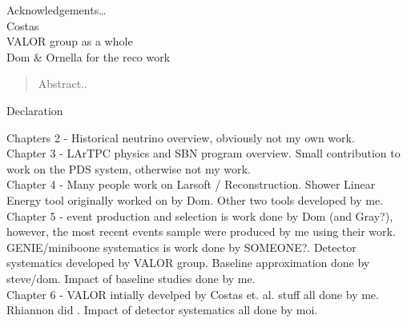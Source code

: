 
\begin{acknowledgements}
  Acknowledgements\dots \\
  Costas \\
  VALOR group as a whole \\
  Dom \& Ornella for the reco work
\end{acknowledgements}

\begin{abstract}%
  Abstract..
\end{abstract}


\begin{declaration}
  Declaration
  \vspace*{1cm}
  
  Chapters 2 - Historical neutrino overview, obviously not my own work. \\
  Chapter 3 - LArTPC physics and SBN program overview. Small contribution to work on the PDS system, otherwise not my work. \\
  Chapter 4 - Many people work on Larsoft / Reconstruction. Shower Linear Energy tool originally worked on by Dom. Other two tools developed by me. \\
  Chapter 5 - \nue event production and selection is work done by Dom (and Gray?), however, the most recent events sample were produced by me using their work. GENIE/miniboone systematics is work done by SOMEONE?. Detector systematics developed by VALOR group. Baseline approximation done by steve/dom. Impact of baseline studies done by me. \\
  Chapter 6 - VALOR intially develped by Costas et. al. \nue stuff all done by me. Rhiannon did \numu. Impact of detector systematics all done by moi. 
  
\end{declaration}






\tableofcontents


\thispagestyle{empty}

\glsaddall 
\printglossaries

\listoffigures
\listoftables





